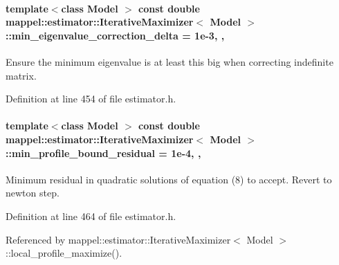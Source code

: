 \paragraph[{\texorpdfstring{min\+\_\+eigenvalue\+\_\+correction\+\_\+delta}{min_eigenvalue_correction_delta}}]{\setlength{\rightskip}{0pt plus 5cm}template$<$class Model $>$ const double {\bf mappel\+::estimator\+::\+Iterative\+Maximizer}$<$ Model $>$\+::min\+\_\+eigenvalue\+\_\+correction\+\_\+delta = 1e-\/3\hspace{0.3cm}{\ttfamily [static]}, {\ttfamily [protected]}, {\ttfamily [inherited]}}\hypertarget{classmappel_1_1estimator_1_1IterativeMaximizer_a9c23c94f649688d01e9eb938a692c6f5}{}\label{classmappel_1_1estimator_1_1IterativeMaximizer_a9c23c94f649688d01e9eb938a692c6f5}


Ensure the minimum eigenvalue is at least this big when correcting indefinite matrix. 



Definition at line 454 of file estimator.\+h.

\paragraph[{\texorpdfstring{min\+\_\+profile\+\_\+bound\+\_\+residual}{min_profile_bound_residual}}]{\setlength{\rightskip}{0pt plus 5cm}template$<$class Model $>$ const double {\bf mappel\+::estimator\+::\+Iterative\+Maximizer}$<$ Model $>$\+::min\+\_\+profile\+\_\+bound\+\_\+residual = 1e-\/4\hspace{0.3cm}{\ttfamily [static]}, {\ttfamily [protected]}, {\ttfamily [inherited]}}\hypertarget{classmappel_1_1estimator_1_1IterativeMaximizer_a04b56451448fa004f4ce3da97bfde9ec}{}\label{classmappel_1_1estimator_1_1IterativeMaximizer_a04b56451448fa004f4ce3da97bfde9ec}


Minimum residual in quadratic solutions of equation (8) to accept. Revert to newton step. 



Definition at line 464 of file estimator.\+h.



Referenced by mappel\+::estimator\+::\+Iterative\+Maximizer$<$ Model $>$\+::local\+\_\+profile\+\_\+maximize().

